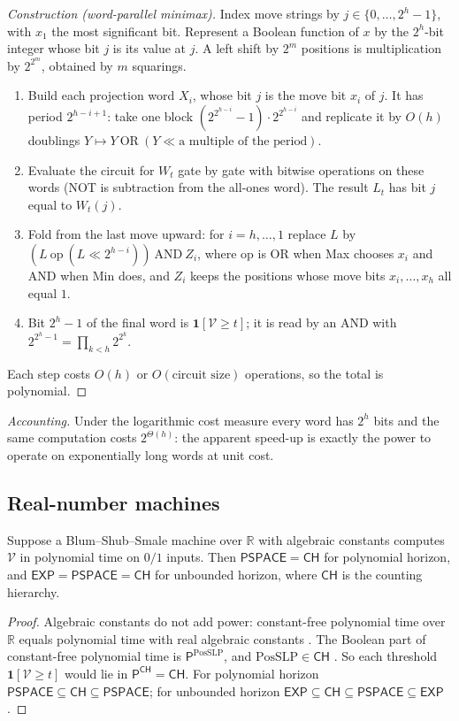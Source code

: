 \documentclass[final]{siamart0516}
\numberwithin{theorem}{section}
\numberwithin{equation}{section}
\theoremstyle{siamnonum}
\theoremstyle{plain}
\newcommand{\RR}{\mathbb{R}}
\newcommand{\val}{\mathcal{V}}            %
\newcommand{\cls}[1]{\mathsf{#1}}
\newcommand{\PSPACE}{\cls{PSPACE}}
\newcommand{\EXP}{\cls{EXP}}
\newcommand{\Pclass}{\cls{P}}
\newcommand{\CH}{\cls{CH}}
\newcommand{\one}{\mathbf{1}}
\begin{document}
\begin{proof}[Construction \textup{(word-parallel minimax)}]
Index move strings by $j\in\{0,\dots,2^h-1\}$, with $x_1$ the most significant bit. Represent a Boolean function of $x$ by the $2^h$-bit integer whose bit $j$ is its value at $j$. A left shift by $2^m$ positions is multiplication by $2^{2^m}$, obtained by $m$ squarings.
\begin{enumerate}[label=\arabic*.]
\item Build each projection word $X_i$, whose bit $j$ is the move bit $x_i$ of $j$. It has period $2^{h-i+1}$: take one block $(2^{2^{h-i}}-1)\cdot2^{2^{h-i}}$ and replicate it by $O(h)$ doublings $Y\mapsto Y\ \mathrm{OR}\ (Y\ll \text{a multiple of the period})$.
\item Evaluate the circuit for $W_t$ gate by gate with bitwise operations on these words (NOT is subtraction from the all-ones word). The result $L_t$ has bit $j$ equal to $W_t(j)$.
\item Fold from the last move upward: for $i=h,\dots,1$ replace $L$ by $(L\ \mathrm{op}\ (L\ll 2^{h-i}))\ \mathrm{AND}\ Z_i$, where op is OR when Max chooses $x_i$ and AND when Min does, and $Z_i$ keeps the positions whose move bits $x_i,\dots,x_h$ all equal $1$.
\item Bit $2^h-1$ of the final word is $\one[\val\ge t]$; it is read by an AND with $2^{2^h-1}=\prod_{k<h}2^{2^k}$.
\end{enumerate}
Each step costs $O(h)$ or $O(\text{circuit size})$ operations, so the total is polynomial.
\end{proof}

\noindent\emph{Accounting.} Under the logarithmic cost measure every word has $2^h$ bits and the same computation costs $2^{\Theta(h)}$: the apparent speed-up is exactly the power to operate on exponentially long words at unit cost.

\subsection{Real-number machines}
\begin{theorem}\label{thm:bss}
Suppose a Blum--Shub--Smale machine over $\RR$ with algebraic constants computes $\val$ in polynomial time on $0/1$ inputs. Then $\PSPACE=\CH$ for polynomial horizon, and $\EXP=\PSPACE=\CH$ for unbounded horizon, where $\CH$ is the counting hierarchy.
\end{theorem}

\begin{proof}
Algebraic constants do not add power: constant-free polynomial time over $\RR$ equals polynomial time with real algebraic constants \cite{ChapuisKoiran}. The Boolean part of constant-free polynomial time is $\Pclass^{\mathrm{PosSLP}}$, and $\mathrm{PosSLP}\in\CH$ \cite{ABKM}. So each threshold $\one[\val\ge t]$ would lie in $\Pclass^{\CH}=\CH$. For polynomial horizon $\PSPACE\subseteq\CH\subseteq\PSPACE$; for unbounded horizon $\EXP\subseteq\CH\subseteq\PSPACE\subseteq\EXP$.
\end{proof}
\end{document}
